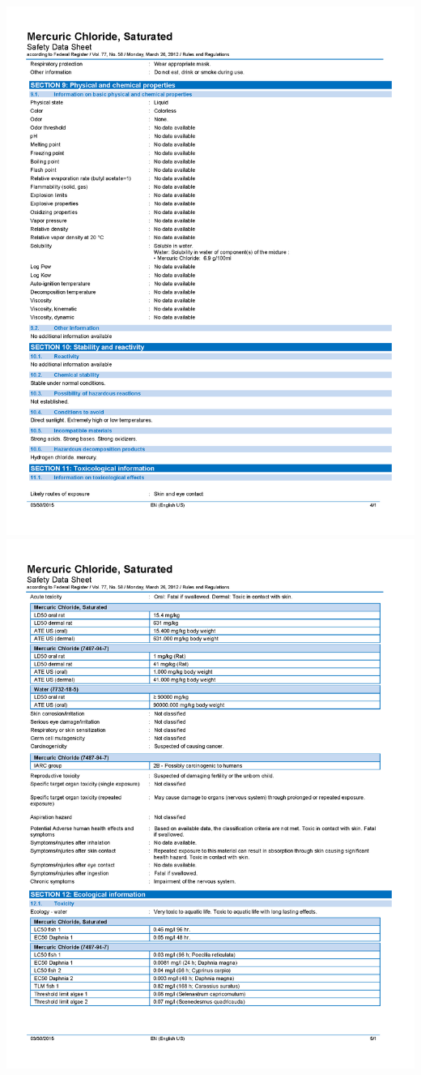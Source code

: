 \documentclass[]{book}
\begin{document}
\includegraphics[width=1\textwidth,height=\textheight]{images/Saturated-Mercuric-Chloride-SDS_Page_4.png}
\includegraphics[width=1\textwidth,height=\textheight]{images/Saturated-Mercuric-Chloride-SDS_Page_5.png}
\end{document}
